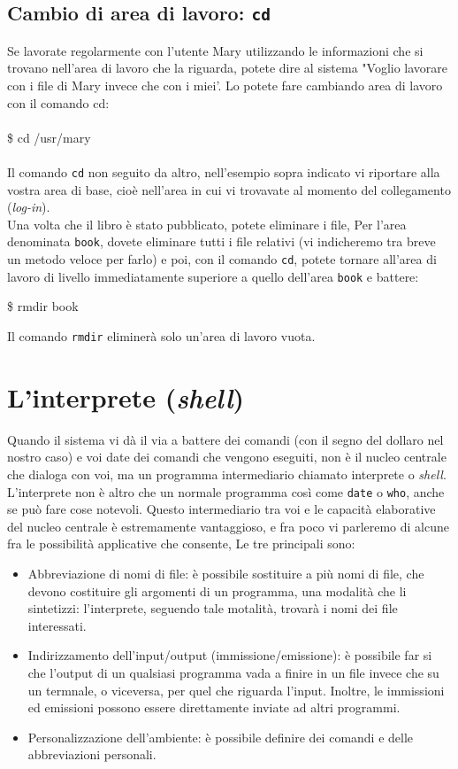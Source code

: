 \subsection{Cambio di area di lavoro: \texttt{cd}}
Se lavorate regolarmente con l'utente Mary utilizzando le informazioni che si trovano 
nell'area di lavoro che la riguarda, potete dire al sistema "Voglio lavorare con i file 
di Mary invece che con i miei'. Lo potete fare cambiando area di lavoro con il comando 
cd:\\\\
\$ cd /usr/mary\\\\
Il comando \texttt{cd} non seguito da altro, nell'esempio sopra indicato vi
riportare alla vostra area di base, cioè nell'area in cui vi trovavate al
momento del collegamento (\textit{log-in}).\\
Una volta che il libro è stato pubblicato, potete eliminare i file, Per l'area
denominata \texttt{book}, dovete eliminare tutti i file relativi (vi
indicheremo tra breve un metodo veloce per farlo) e poi, con il comando
\texttt{cd}, potete tornare all'area di lavoro di livello immediatamente
superiore a quello dell'area \texttt{book} e battere:
	\begin{multicols}{2}
		\$ rmdir book
	\end{multicols}

Il comando \texttt{rmdir} eliminerà solo un'area di lavoro vuota.

\section{L'interprete (\textit{shell})}
Quando il sistema vi dà il via a battere dei comandi (con il segno del dollaro
nel nostro caso) e voi date dei comandi che vengono eseguiti, non è il nucleo
centrale che dialoga con voi, ma un programma intermediario chiamato interprete
o \textit{shell}. L'interprete non è altro che un normale programma così come
\texttt{date} o \texttt{who}, anche se può fare cose notevoli. Questo
intermediario tra voi e le capacità elaborative del nucleo centrale è
estremamente vantaggioso, e fra poco vi parleremo di alcune fra le possibilità
applicative che consente, Le tre principali sono:
\begin{itemize}
	\item Abbreviazione di nomi di file: è possibile sostituire a più nomi di
		file, che devono costituire gli argomenti di un programma, una modalità
		che li sintetizzi: l'interprete, seguendo tale motalità, trovarà i nomi
		dei file interessati.
	\item Indirizzamento dell'input/output (immissione/emissione): è possibile
		far si che l'output di un qualsiasi programma vada a finire in un file
		invece che su un termnale, o viceversa, per quel che riguarda l'input.
		Inoltre, le immissioni ed emissioni possono essere direttamente inviate
		ad altri programmi.
	\item Personalizzazione dell'ambiente: è possibile definire dei comandi e
		delle abbreviazioni personali.
\end{itemize}
